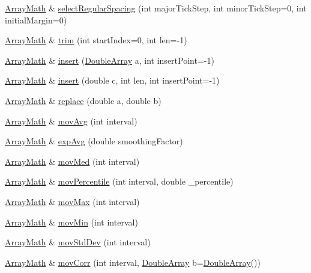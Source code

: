 \begin{DoxyCompactItemize}
\hyperlink{class_array_math}{Array\+Math} \& \hyperlink{class_array_math_a7fa60f8da0b8448ec591ce7f4b95f251}{select\+Regular\+Spacing} (int major\+Tick\+Step, int minor\+Tick\+Step=0, int initial\+Margin=0)
\item 
\hyperlink{class_array_math}{Array\+Math} \& \hyperlink{class_array_math_a07cdedd06b274fbd5a5be338cd507861}{trim} (int start\+Index=0, int len=-\/1)
\item 
\hyperlink{class_array_math}{Array\+Math} \& \hyperlink{class_array_math_a36c129c503f3fe99e8a92ba265eae19e}{insert} (\hyperlink{class_double_array}{Double\+Array} a, int insert\+Point=-\/1)
\item 
\hyperlink{class_array_math}{Array\+Math} \& \hyperlink{class_array_math_a2cebd29ee37fb8f24de84cbd14cd4b46}{insert} (double c, int len, int insert\+Point=-\/1)
\item 
\hyperlink{class_array_math}{Array\+Math} \& \hyperlink{class_array_math_a3e735bfc88ee0149c7056cac1defbf6c}{replace} (double a, double b)
\item 
\hyperlink{class_array_math}{Array\+Math} \& \hyperlink{class_array_math_abaaac1009dda4a6124ecd2182354dc39}{mov\+Avg} (int interval)
\item 
\hyperlink{class_array_math}{Array\+Math} \& \hyperlink{class_array_math_a2f9029cfd45e1094dd6aeb549bbcd107}{exp\+Avg} (double smoothing\+Factor)
\item 
\hyperlink{class_array_math}{Array\+Math} \& \hyperlink{class_array_math_a7f994291fd85c2859e7bf34c27b8013e}{mov\+Med} (int interval)
\item 
\hyperlink{class_array_math}{Array\+Math} \& \hyperlink{class_array_math_adc007aad3ce9cac15f02159190c2c84a}{mov\+Percentile} (int interval, double \+\_\+percentile)
\item 
\hyperlink{class_array_math}{Array\+Math} \& \hyperlink{class_array_math_a5134853d9b14c3d980036a02a4d4b043}{mov\+Max} (int interval)
\item 
\hyperlink{class_array_math}{Array\+Math} \& \hyperlink{class_array_math_a42df280f64eaaad8150985d962516276}{mov\+Min} (int interval)
\item 
\hyperlink{class_array_math}{Array\+Math} \& \hyperlink{class_array_math_a0352f506e872e964ef2590fa7e8ce581}{mov\+Std\+Dev} (int interval)
\item 
\hyperlink{class_array_math}{Array\+Math} \& \hyperlink{class_array_math_a61cdecb4beb7c276a122306906cdebd8}{mov\+Corr} (int interval, \hyperlink{class_double_array}{Double\+Array} b=\hyperlink{class_double_array}{Double\+Array}())

\end{DoxyCompactItemize}
